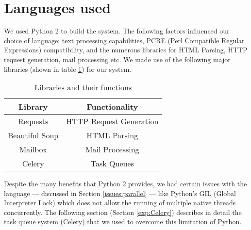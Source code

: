 \section{Languages used}

We used Python 2 to build the system. The following factors influenced our choice of language: text processing capabilities, PCRE (Perl Compatible Regular Expressions) compatibility, and the numerous libraries for HTML Parsing, HTTP request generation, mail processing etc.
We made use of the following major libraries (shown in table \ref{tab:libs}) for our system.

\begin{table}[!htbp]
	\centering
	\begin{tabular}{|c|c|}
		\hline
		Library & Functionality\\
		\hline
		Requests & HTTP Request Generation\\
		\hline
		Beautiful Soup & HTML Parsing\\
		\hline
		Mailbox & Mail Processing\\
		\hline
		Celery & Task Queues\\
		\hline
	\end{tabular}
	\caption{Libraries and their functions}
	\label{tab:libs}
\end{table}

Despite the many benefits that Python 2 provides, we had certain issues with the language --- discussed in Section \ref{issues:parallel} --- like Python's GIL (Global Interpreter Lock) which does not allow the running of multiple native threads concurrently.
The following section (Section \ref{exp:Celery}) describes in detail the task queue system (Celery) that we used to overcome this limitation of Python.
